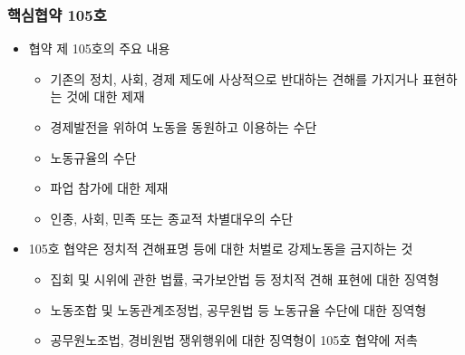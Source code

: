 \documentclass[aspectratio=169,xcolor=dvipsnames,handout]{beamer}
\begin{document}
\begin{frame}
    \frametitle{핵심협약 105호}
    \begin{itemize}[<+->]
        \item 협약 제 105호의 주요 내용
        \begin{itemize}
            \item 기존의 정치, 사회, 경제 제도에 사상적으로 반대하는 견해를 가지거나 표현하는 것에 대한 제재
            \item 경제발전을 위하여 노동을 동원하고 이용하는 수단
            \item 노동규율의 수단
            \item 파업 참가에 대한 제재
            \item 인종, 사회, 민족 또는 종교적 차별대우의 수단
        \end{itemize}
        \item 105호 협약은 정치적 견해표명 등에 대한 처벌로 강제노동을 금지하는 것
        \begin{itemize}
            \item 집회 및 시위에 관한 법률, 국가보안법 등 정치적 견해 표현에 대한 징역형
            \item 노동조합 및 노동관계조정법, 공무원법 등 노동규율 수단에 대한 징역형
            \item 공무원노조법, 경비원법 쟁위행위에 대한 징역형이 105호 협약에 저촉
        \end{itemize}
    \end{itemize}
\end{frame}

\end{document}
